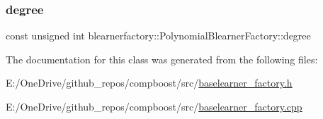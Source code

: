 \subsubsection{\texorpdfstring{degree}{degree}}
{\footnotesize\ttfamily const unsigned int blearnerfactory\+::\+Polynomial\+Blearner\+Factory\+::degree\hspace{0.3cm}{\ttfamily [private]}}



The documentation for this class was generated from the following files\+:\begin{DoxyCompactItemize}
\item 
E\+:/\+One\+Drive/github\+\_\+repos/compboost/src/\mbox{\hyperlink{baselearner__factory_8h}{baselearner\+\_\+factory.\+h}}\item 
E\+:/\+One\+Drive/github\+\_\+repos/compboost/src/\mbox{\hyperlink{baselearner__factory_8cpp}{baselearner\+\_\+factory.\+cpp}}\end{DoxyCompactItemize}
